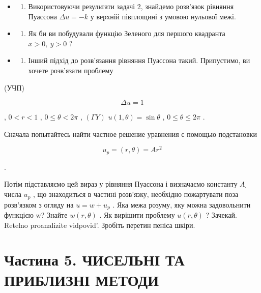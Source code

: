 \documentclass[
  ukrainian,
]{article}
\providecommand{\tightlist}{%
  \setlength{\itemsep}{0pt}\setlength{\parskip}{0pt}}
\begin{document}
\begin{itemize}
\tightlist
\item
  \begin{enumerate}
  \def\labelenumi{\arabic{enumi}.}
  \setcounter{enumi}{2}
  \tightlist
  \item
    Використовуючи результати задачі 2, знайдемо розв'язок рівняння
    Пуассона \(\Delta u = -k\) у верхній півплощині з умовою нульової
    межі.
  \end{enumerate}
\item
  \begin{enumerate}
  \def\labelenumi{\arabic{enumi}.}
  \setcounter{enumi}{3}
  \tightlist
  \item
    Як би ви побудували функцію Зеленого для першого квадранта
    \(x>0,\ y>0\) ?
  \end{enumerate}
\item
  \begin{enumerate}
  \def\labelenumi{\arabic{enumi}.}
  \setcounter{enumi}{4}
  \tightlist
  \item
    Інший підхід до розв'язання рівняння Пуассона такий. Припустимо, ви
    хочете розв'язати проблему
  \end{enumerate}
\end{itemize}

(УЧП)

\[
\Delta u = 1
\]

, \(0 < r < 1\) , \(0 \le \theta < 2\pi\) , \((\Gamma Y)\)
\(u(1, \theta) = \sin \theta\) , \(0 \le \theta \le 2\pi\) .

Сначала попытайтесь найти частное решение уравнения с помощью
подстановки

\[
u_p = (r, \theta) = Ar^2
\]

.

Потім підставляємо цей вираз у рівняння Пуассона і визначаємо константу
\(A_{\cdot}\) числа \(u_p\) , що знаходиться в частині розв'язку,
необхідно пожартувати поза розв'язком з огляду на \(u=w+u_p\) . Яка межа
розуму, яку можна задовольнити функцією w? Знайте \(w(r, \theta)\) . Як
вирішити проблему \(u(r, \theta)\) ? Зачекай. Retelno proanalizite
vidpovid'. Зробіть перетин пеніса шкіри.

\section{Частина 5. ЧИСЕЛЬНІ ТА ПРИБЛИЗНІ
МЕТОДИ}\label{ux447ux430ux441ux442ux438ux43dux430-5.-ux447ux438ux441ux435ux43bux44cux43dux456-ux442ux430-ux43fux440ux438ux431ux43bux438ux437ux43dux456-ux43cux435ux442ux43eux434ux438}
\end{document}
